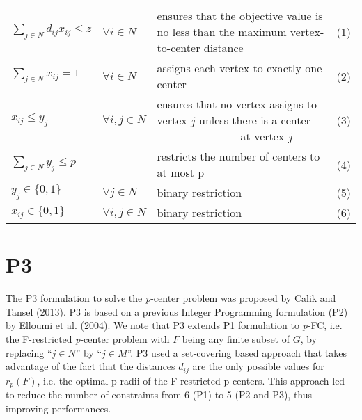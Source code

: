 \renewcommand{\arraystretch}{2}
\begin{tabularx}{\textwidth}{l l X r}
$\sum\limits_{j \in N} d_{ij} x_{ij}\leq z$ & $\forall i \in N$ & ensures that the objective value is no less than the maximum vertex-to-center distance & (1)\\
$\sum\limits_{j \in N} x_{ij} = 1$ & $\forall i \in N$ & assigns each vertex to exactly one center & (2)\\
$x_{ij} \leq y_j$ & $\forall i, j \in N$ & ensures that no vertex assigns to vertex $j$ unless there is a center \ \ \ \ \ \ \ \ \ \ \ \ \ \ \ at vertex $j$ & (3)\\
$\sum\limits_{j \in N} y_{j} \leq p$ & & restricts the number of centers to at most p & (4)\\
$y_{j} \in \lbrace 0, 1\rbrace$ & $\forall j \in N$ & binary restriction & (5)\\
$x_{ij} \in \lbrace 0, 1\rbrace$ & $\forall i, j \in N$ & binary restriction  & (6)
\end{tabularx}

\section{P3}
The P3 formulation to solve the \textit{p}-center problem was proposed by Calik and Tansel (2013). P3 is based on a previous Integer Programming formulation (P2) by Elloumi et al. (2004). We note that P3 extends P1 formulation to \textit{p}-FC, i.e. the F-restricted \textit{p}-center problem with $F$ being any finite subset of $G$,  by replacing ``$j \in N$'' by ``$j \in M$''. P3 used a set-covering based approach that takes advantage of the fact that the distances $d_{ij}$ are the only possible values for $r_p(F)$, i.e. the optimal p-radii of the F-restricted p-centers. This approach led to reduce the number of constraints from 6 (P1) to 5 (P2 and P3), thus improving performances. 

